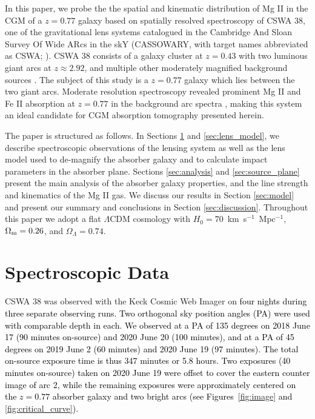 \documentclass[twocolumn]{aastex62}
\newcommand{\MgII}{Mg\tiny{ }\footnotesize{II}\normalsize{ }}
\newcommand{\FeII}{Fe\tiny{ }\footnotesize{II}\normalsize{ }}
\newcommand{\CA}[1]{\textcolor{blue}{CA: #1}}
\newcommand{\comment}[1]{\textcolor{black}{#1}}
\begin{document}
In this paper, we probe the the spatial and kinematic distribution of \MgII in the CGM of a $z=0.77$ galaxy based on spatially resolved spectroscopy of CSWA 38, one of the gravitational lens systems catalogued in the Cambridge
And Sloan Survey Of Wide ARcs in the skY (CASSOWARY, with target names abbreviated as CSWA; \citealt{Belokurov2007,Belokurov2009}). CSWA 38 consists of a galaxy cluster at $z=0.43$ with two luminous giant arcs at $z\approx2.92$, and multiple other moderately magnified background sources \citep[Figure~\ref{fig:image};][]{Koester2010,Bayliss2011}. The subject of this study is a $z=0.77$ galaxy which lies between the two giant arcs. Moderate resolution spectroscopy revealed prominent \MgII and \FeII absorption at $z=0.77$ in the background arc spectra \citep{Jones2018}, making this system an ideal candidate for CGM absorption tomography presented herein.

The paper is structured as follows. In Sections \ref{sec:data} and \ref{sec:lens_model}, we describe spectroscopic observations of the lensing system as well as the lens model used to de-magnify the absorber galaxy and to calculate impact parameters in the absorber plane. Sections \ref{sec:analysis} and \ref{sec:source_plane} present the main analysis of the absorber galaxy properties, and the line strength and kinematics of the \MgII gas. We discuss our results in Section \ref{sec:model} and present our summary and conclusions in Section \ref{sec:discussion}. Throughout this paper we adopt a flat $\Lambda$CDM cosmology with $H_0 = 70$~km~s$^{-1}$~Mpc$^{-1}$, $\Omega_{\rm m} = 0.26$, and $\Omega_{\Lambda} = 0.74$.



\section{Spectroscopic Data} \label{sec:data}


CSWA 38 was observed with the Keck Cosmic Web Imager \citep[KCWI;][]{Morrissey2018} on \comment{four nights during three separate observing runs. Two orthogonal sky position angles (PA) were used with comparable depth in each. We observed at a PA of 135 degrees on 2018 June 17 (90 minutes on-source) and 2020 June 20 (100 minutes), and at a PA of 45 degrees on 2019 June 2 (60 minutes) and 2020 June 19 (97 minutes). The total on-source exposure time is thus 347 minutes or 5.8 hours. 
Two exposures (40 minutes on-source) taken on 2020 June 19 were offset to cover the eastern counter image of arc 2, while the remaining exposures were approximately centered on the $z=0.77$ absorber galaxy and two bright arcs (see Figures~\ref{fig:image} and \ref{fig:critical_curve}). 
}
\end{document}
